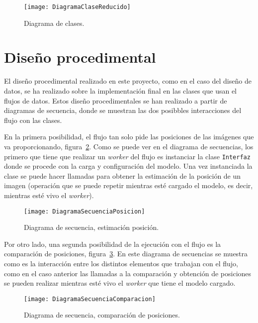 \begin{figure}[h]
	\centering
	\texttt{[image: DiagramaClaseReducido]}
	\caption{Diagrama de clases.}
	\label{fig:diacla}
\end{figure}

\section{Diseño procedimental}

El diseño procedimental realizado en este proyecto, como en el caso del diseño de datos, se ha realizado sobre la implementación final en las clases que usan el flujos de datos. Estos diseño procedimentales se han realizado a partir de diagramas de secuencia, donde se muestran las dos posibbles interacciones del flujo con las clases.

En la primera posibilidad, el flujo tan solo pide las posiciones de las imágenes que va proporcionando, figura~\ref{fig:diasec1}. Como se puede ver en el diagrama de secuencias, los primero que tiene que realizar un \textit{worker} del flujo es instanciar la clase \texttt{Interfaz} donde se procede con la carga y configuración del modelo. Una vez instanciada la clase se puede hacer llamadas para obtener la estimación de la posición de un imagen (operación que se puede repetir mientras esté cargado el modelo, es decir, mientras esté vivo el \textit{worker}).

\begin{figure}[h]
	\centering
	\texttt{[image: DiagramaSecuenciaPosicion]}
	\caption{Diagrama de secuencia, estimación posición.}
	\label{fig:diasec1}
\end{figure}

Por otro lado, una segunda posibilidad de la ejecución con el flujo es la comparación de posiciones, figura~\ref{fig:diasec2}. En este diagrama de secuencias se muestra como es la interacción entre los distintos elementos que trabajan con el flujo, como en el caso anterior las llamadas a la comparación y obtención de posiciones se pueden realizar mientras esté vivo el \textit{worker} que tiene el modelo cargado.

\begin{figure}[h]
	\centering
	\texttt{[image: DiagramaSecuenciaComparacion]}
	\caption{Diagrama de secuencia, comparación de posiciones.}
	\label{fig:diasec2}
\end{figure}


